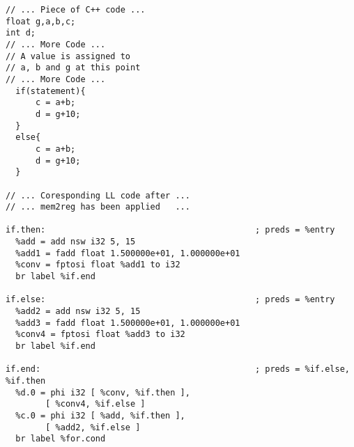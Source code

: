 \begin{lstlisting}[caption=Merging in Available Expression Analysis preview, label=mAEA]
// ... Piece of C++ code ...
float g,a,b,c;
int d;
// ... More Code ...
// A value is assigned to
// a, b and g at this point
// ... More Code ...
  if(statement){
	  c = a+b;
	  d = g+10;
  }
  else{
	  c = a+b;
	  d = g+10;
  }

// ... Coresponding LL code after ...
// ... mem2reg has been applied   ...

if.then:                                          ; preds = %entry
  %add = add nsw i32 5, 15
  %add1 = fadd float 1.500000e+01, 1.000000e+01
  %conv = fptosi float %add1 to i32
  br label %if.end

if.else:                                          ; preds = %entry
  %add2 = add nsw i32 5, 15
  %add3 = fadd float 1.500000e+01, 1.000000e+01
  %conv4 = fptosi float %add3 to i32
  br label %if.end

if.end:                                           ; preds = %if.else, %if.then
  %d.0 = phi i32 [ %conv, %if.then ], 
        [ %conv4, %if.else ]
  %c.0 = phi i32 [ %add, %if.then ], 
        [ %add2, %if.else ]
  br label %for.cond
  
\end{lstlisting}




















